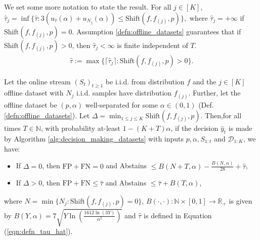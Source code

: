 We set some more notation to state the result.
For all $j \in [K]$, $\widehat{\tau}_j = \inf \{ \widehat{\tau}: 3(u_{\widehat{\tau}}(\alpha) + u_{N_j}(\alpha)) \leq \text{Shift}(f,f_{(j)},p) \},$
where $\widehat{\tau}_j = +\infty$ if $\text{Shift}(f,f_{(j)},p)=0$. Assumption \ref{defn:offline_datasets} guarantees that if $\text{Shift}(f,f_{(j)},p)>0$, then $\widehat{\tau}_j  < \infty$ is finite independent of $T$.
\begin{align}
    \widehat{\tau} := \max \{ \lceil \widehat{\tau}_j \rceil : \text{Shift}(f,f_{(j)}, p) > 0 \}.
    \label{eqn:defn_tau_hat}
\end{align}

\begin{theorem} Let the online stream $(S_t)_{t \geq 1} $ be i.i.d. from distribution $f$ and the $j \in [K]$ offline dataset with $N_j$ i.i.d. samples have distribution $f_{(j)}$. Further, let the offline dataset be $(p,\alpha)$ well-separated for some $\alpha \in (0,1)$ (Def. \ref{defn:offline_datasets}). Let $\Delta = \min_{1\leq j \leq K} \text{Shift}(f, f_{(j)},p)$. Then,for all times $T \in \mathbb{N}$, with probability at-least $1-(K+T)\alpha$, if the decision $\hat{y}_t$ is made by Algorithm \ref{alg:decision_making_datasets} with inputs $p, \alpha, S_{1:t}$ and $\mathcal{D}_{1:K}$, we have:
\begin{itemize}[itemsep=2pt,topsep=-1pt,labelwidth=!, labelindent=0pt]
\item  If $\Delta = 0$, then $\text{FP} + \text{FN} = 0$ and Abstains  $\leq {B}(N+T,\alpha) - \frac{B(N,\alpha)}{28} + \widehat{\tau}$, %
\item If  $\Delta > 0$, then $\text{FP}+\text{FN} \leq \widehat{\tau} $ and Abstains  $ \leq \widehat{\tau} + B(T,\alpha)$,
\end{itemize}
where  $N = \min \{N_j: \text{Shift}(f,f_{(j)},p)=0\}$, $B(\cdot, \cdot) : \mathbb{N} \times [0,1] \to \mathbb{R}_{+}$ is given by $B(Y,\alpha) =  7\sqrt{Y \ln \left( \frac{1612\ln(3Y)}{\alpha^2} \right)}$ and $\widehat{\tau}$ is defined in Equation (\ref{eqn:defn_tau_hat}).


\end{theorem}
